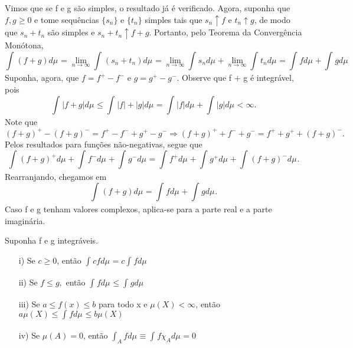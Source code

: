 \documentclass[measure_theory.tex]{subfiles}
\begin{document}
\begin{proof*}
	Vimos que se f e g são simples, o resultado já é verificado. Agora, suponha que \(f, g \geq 0\) e tome sequências \(\{s_{n}\}\) e \(\{t_{n}\}\) simples tais que
	\(s_{n}\uparrow f\) e \(t_{n}\uparrow g\), de modo que \(s_{n}+t_{n}\) são simples e \(s_{n}+t_{n}\uparrow f+g\). Portanto, pelo Teorema da Convergência Monótona,
	\[
		\int_{}(f+g) d\mu_{} = \lim_{n\to \infty}\int_{}(s_{n} + t_{n}) d\mu_{} = \lim_{n\to \infty}\int_{}s_{n} d\mu_{} + \lim_{n\to \infty}\int_{}t_{n} d\mu_{} = \int_{}f d\mu_{} + \int_{}g d\mu_{}
	\]
	Suponha, agora, que \(f = f^{+} - f^{-}\) e \(g = g^{+}-g^{-}.\) Observe que f + g é integrável, pois
	\[
		\int_{}|f+g| d\mu_{} \leq \int_{}|f| + |g| d\mu_{} = \int_{}|f| d\mu_{} + \int_{}|g| d\mu_{} < \infty.
	\]
	Note que
	\[
		(f+g)^{+} - (f+g)^{-} = f^{+} - f^{-} + g^{+}-g^{-} \Rightarrow (f+g)^{+} + f^{-} + g^{-} = f^{+} + g^{+} + (f+g)^{-}.
	\]
	Pelos resultados para funções não-negativas, segue que
	\[
		\int_{}(f+g)^{+} d\mu_{} + \int_{}f^{-} d\mu_{} + \int_{}g^{-} d\mu_{} = \int_{}f^{+} d\mu_{} + \int_{}g^{+} d\mu_{} + \int_{}(f+g)^{-} d\mu_{}.
	\]
	Rearranjando, chegamos em
	\[
		\int_{}(f+g) d\mu_{} = \int_{}f d\mu_{} + \int_{}g d\mu_{}.
	\]
	Caso f e g tenham valores complexos, aplica-se para a parte real e a parte imaginária. \qedsymbol
\end{proof*}
\begin{prop*}
	Suponha f e g integráveis.
	\begin{itemize}
		\item[i)] Se \(c\geq 0\), então \(\int_{}cf d\mu_{} = c \int_{}f d\mu_{}\)
		\item[ii)] Se \(f \leq g,\) então \(\int_{}f d\mu_{} \leq \int_{}g d\mu_{}\)
		\item[iii)] Se \(a\leq f(x) \leq b\) para todo x e \(\mu (X) < \infty\), então \(a\mu (X) \leq \int_{}f d\mu_{} \leq b\mu (X)\)
		\item[iv)] Se \(\mu (A) = 0\), então \(\int_{A}f d\mu_{}\equiv \int_{}f \chi_{A} d\mu_{} = 0\)
	\end{itemize}
\end{prop*}
\end{document}
